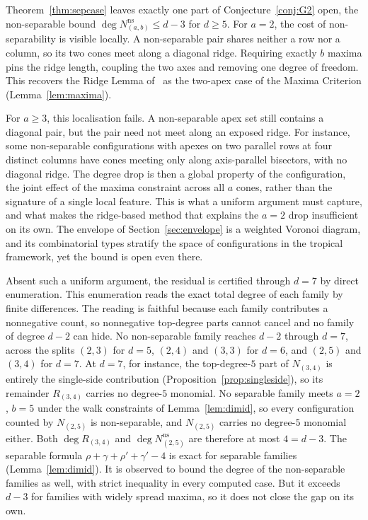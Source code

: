 \documentclass[11pt]{article}
\theoremstyle{definition}
\theoremstyle{remark}
\begin{document}
Theorem~\ref{thm:sepcase} leaves exactly one part of Conjecture~\ref{conj:G2}
open, the non-separable bound $\deg N^{\mathrm{ns}}_{(a,b)}\le d-3$ for $d\ge5$.
For $a=2$, the cost of non-separability is visible locally. A non-separable pair
shares neither a row nor a column, so its two cones meet along a diagonal ridge.
Requiring exactly $b$ maxima pins the ridge length, coupling the two axes and
removing one degree of freedom. This recovers the Ridge Lemma of~\cite{Gupta2026companion} as
the two-apex case of the Maxima Criterion (Lemma~\ref{lem:maxima}).

For $a\ge3$, this localisation fails. A non-separable apex set still contains a diagonal
pair, but the pair need not meet along an exposed ridge. For instance, some
non-separable configurations with apexes on two parallel rows at four distinct
columns have cones meeting only along axis-parallel bisectors, with no diagonal
ridge. The degree drop is then a
global property of the configuration, the joint effect of the maxima constraint
across all $a$ cones, rather than the signature of a single local feature. This
is what a uniform argument must capture, and what makes the ridge-based method that
explains the $a=2$ drop insufficient on its own.
The envelope of Section~\ref{sec:envelope} is a weighted Voronoi diagram, and its
combinatorial types stratify the space of configurations in the tropical
framework, yet the bound is open even there.

Absent such a uniform argument, the residual is certified through $d=7$ by direct
enumeration. This enumeration reads the exact total degree of each family by finite
differences. The reading is faithful because each family contributes a nonnegative
count, so nonnegative top-degree parts cannot cancel and no family of degree $d-2$
can hide. No non-separable family
reaches $d-2$ through $d=7$, across the splits $(2,3)$ for $d=5$, $(2,4)$ and
$(3,3)$ for $d=6$, and $(2,5)$ and $(3,4)$ for $d=7$. At $d=7$, for instance,
the top-degree-$5$ part of $N_{(3,4)}$ is entirely the single-side contribution
(Proposition~\ref{prop:singleside}), so its remainder $R_{(3,4)}$ carries no degree-$5$
monomial. No separable family meets $a=2$, $b=5$ under the walk constraints of
Lemma~\ref{lem:dimid}, so every configuration counted by $N_{(2,5)}$ is
non-separable, and $N_{(2,5)}$ carries no degree-$5$ monomial either. Both $\deg R_{(3,4)}$ and $\deg N^{\mathrm{ns}}_{(2,5)}$ are therefore at most
$4=d-3$. The separable formula
$\rho+\gamma+\rho'+\gamma'-4$ is exact for separable families
(Lemma~\ref{lem:dimid}). It is observed to bound the degree of the non-separable
families as well, with strict inequality in every computed case. But it exceeds
$d-3$ for families with widely spread maxima, so it does not close the gap on
its own.
\end{document}
